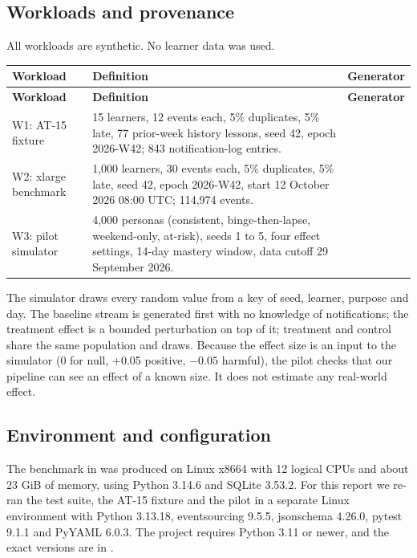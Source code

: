 \documentclass[11pt,a4paper]{article}
\newcommand{\hdr}[1]{\textbf{\color{white}\sffamily\small #1}}
\renewcommand{\_}{\textunderscore\allowbreak{}}
\begin{document}
\subsection{Workloads and provenance}

All workloads are synthetic. No learner data was used.

\begin{xltabular}{\textwidth}{@{}L{2.5cm} Y L{4.0cm}@{}}
 \hdr{Workload} & \hdr{Definition} & \hdr{Generator} \\
\endfirsthead
{} \hdr{Workload} & \hdr{Definition} & \hdr{Generator} \\
\endhead
{} W1: AT-15 fixture & 15 learners, 12 events each, 5\% duplicates, 5\% late, 77 prior-week history lessons, seed 42, epoch 2026-W42; 843 notification-log entries. &  \\
W2: xlarge benchmark & 1,000 learners, 30 events each, 5\% duplicates, 5\% late, seed 42, epoch 2026-W42, start 12 October 2026 08:00 UTC; 114,974 events. &  \\
 W3: pilot simulator & 4,000 personas (consistent, binge-then-lapse, weekend-only, at-risk), seeds 1 to 5, four effect settings, 14-day mastery window, data cutoff 29 September 2026. &  \\
\end{xltabular}

The simulator draws every random value from a key of seed, learner, purpose and day. The baseline stream is generated first with no knowledge of notifications; the treatment effect is a bounded perturbation on top of it; treatment and control share the same population and draws. Because the effect size is an input to the simulator (0 for null, +0.05 positive, $-0.05$ harmful), the pilot checks that our pipeline can see an effect of a known size. It does not estimate any real-world effect.

\subsection{Environment and configuration}

The benchmark in  was produced on Linux x86\_64 with 12 logical CPUs and about 23 GiB of memory, using Python 3.14.6 and SQLite 3.53.2. For this report we re-ran the test suite, the AT-15 fixture and the pilot in a separate Linux environment with Python 3.13.18, eventsourcing 9.5.5, jsonschema 4.26.0, pytest 9.1.1 and PyYAML 6.0.3. The project requires Python 3.11 or newer, and the exact versions are in .
\end{document}
